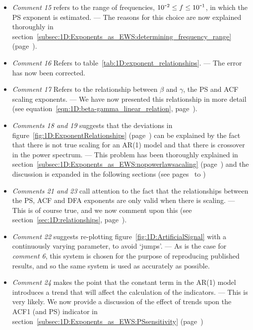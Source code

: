 \begin{itemize}
	\item \emph{Comment 15} refers to the range of frequencies, $10^{\textup{\texttt{-}}2}\leq f \leq 10^{\textup{\texttt{-}}1}$, in which the PS exponent is estimated. — The reasons for this choice are now explained thoroughly in section~\ref{subsec:1D:Exponents_as_EWS:determining_frequency_range} (page~\pageref{subsec:1D:Exponents_as_EWS:determining_frequency_range}).
	\item \emph{Comment 16} Refers to table~\ref{tab:1D:exponent_relationships}. — The error has now been corrected.
	\item \emph{Comment 17} Refers to the relationship between $\beta$ and $\gamma$, the PS and ACF scaling exponents. — We have now presented this relationship in more detail (see equation~\ref{eqn:1D:beta-gamma_linear_relation}, page~\pageref{eqn:1D:beta-gamma_linear_relation}).
	\item \emph{Comments 18 and 19} suggests that the deviations in figure~\ref{fig:1D:ExponentRelationships} (page~\pageref{fig:1D:ExponentRelationships}) can be explained by the fact that there is not true scaling for an AR(1) model and that there is crossover in the power spectrum. — This problem has been thoroughly explained in section~\ref{subsec:1D:Exponents_as_EWS:nopowerlawsacaling} (page~\pageref{subsec:1D:Exponents_as_EWS:nopowerlawsacaling}) and the discussion is expanded in the following sections (see pages~\pageref{subsec:1D:Exponents_as_EWS:determining_frequency_range} to \pageref{sec:1D:numerical_integration})
	\item \emph{Comments 21 and 23} call attention to the fact that the relationships between the PS, ACF and DFA exponents are only valid when there is scaling. — This is of course true, and we now comment upon this (see section~\ref{sec:1D:relationships}, page~\pageref{sec:1D:relationships}).
	\item \emph{Comment 22} suggests re-plotting figure~\ref{fig:1D:ArtificialSignal} with a continuously varying parameter, to avoid `jumps'. — As is the case for \emph{comment 6}, this system is chosen for the purpose of reproducing published results, and so the same system is used as accurately as possible. 
	\item \emph{Comment 24} makes the point that the constant term in the AR(1) model introduces a trend that will affect the calculation of the indicators. — This is very likely. We now provide a discussion of the effect of trends upon the ACF1 (and PS) indicator in section~\ref{subsec:1D:Exponents_as_EWS:PSsensitivity} (page~\pageref{subsec:1D:Exponents_as_EWS:PSsensitivity})

\end{itemize}
